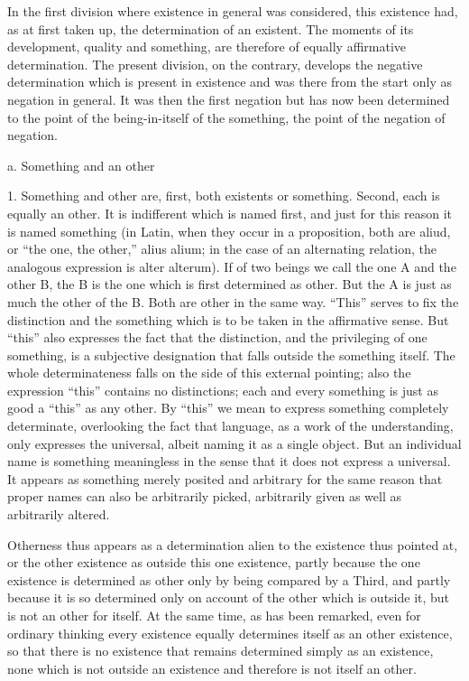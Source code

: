 In the first division where existence in general was considered,
this existence had, as at first taken up, the determination of an existent.
The moments of its development, quality and something,
are therefore of equally affirmative determination.
The present division, on the contrary, develops
the negative determination which is present in existence
and was there from the start only as negation in general.
It was then the first negation but has now been determined to
the point of the being-in-itself of the something,
the point of the negation of negation.

a. Something and an other

1. Something and other are,
first, both existents or something.
Second, each is equally an other.
It is indifferent which is named first,
and just for this reason it is named something
(in Latin, when they occur in a proposition,
both are aliud, or “the one, the other,” alius alium;
in the case of an alternating relation,
the analogous expression is alter alterum).
If of two beings we call the one A and the other B,
the B is the one which is first determined as other.
But the A is just as much the other of the B.
Both are other in the same way.
“This” serves to fix the distinction
and the something which is to be taken in the affirmative sense.
But “this” also expresses the fact that the distinction,
and the privileging of one something,
is a subjective designation that falls outside the something itself.
The whole determinateness falls on the side of this external pointing;
also the expression “this” contains no distinctions;
each and every something is just as good a “this” as any other.
By “this” we mean to express something completely determinate,
overlooking the fact that language, as a work of the understanding,
only expresses the universal, albeit naming it as a single object.
But an individual name is something meaningless in the sense
that it does not express a universal.
It appears as something merely posited
and arbitrary for the same reason
that proper names can also be arbitrarily picked,
arbitrarily given as well as arbitrarily altered.

Otherness thus appears as a determination 
alien to the existence thus pointed at,
or the other existence as outside this one existence,
partly because the one existence is determined as other
only by being compared by a Third,
and partly because it is so determined
only on account of the other which is outside it,
but is not an other for itself.
At the same time, as has been remarked,
even for ordinary thinking every existence
equally determines itself as an other existence,
so that there is no existence
that remains determined simply as an existence,
none which is not outside an existence
and therefore is not itself an other.

